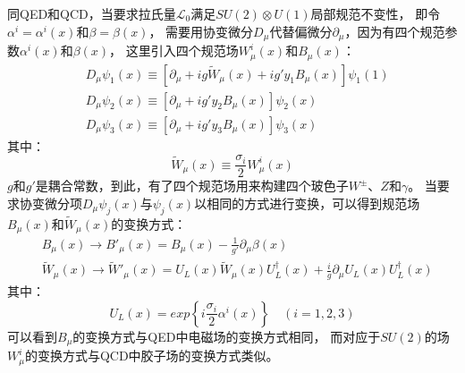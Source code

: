 同QED和QCD，当要求拉氏量$\mathcal{L}_0$满足$SU(2) \otimes U(1)$局部规范不变性，
即令$\alpha^i=\alpha^i(x)$和$\beta=\beta(x)$，
需要用协变微分$D_{\mu}$代替偏微分$\partial_{\mu}$，因为有四个规范参数$\alpha^i(x)$和$\beta(x)$，
这里引入四个规范场$W^i_{\mu}(x)$和$B_{\mu}(x)$：
\begin{equation} 
\label{eq:EW7}
 \begin{split}
  &D_{\mu}\psi_1(x) \equiv \left[ \partial_{\mu}+ig\widetilde{W}_{\mu}(x)+ig'y_1B_{\mu}(x) \right] \psi_1(1)
  \\
 & D_{\mu}\psi_2(x) \equiv \left[ \partial_{\mu}+ig'y_2B_{\mu}(x) \right] \psi_2(x)
  \\
 & D_{\mu}\psi_3(x) \equiv \left[ \partial_{\mu}+ig'y_3B_{\mu}(x) \right] \psi_3(x)
 \end{split}
\end{equation}
其中：
\begin{equation} 
\label{eq:EW8}
\widetilde{W}_{\mu}(x) \equiv \frac{\sigma_i}{2} W^i_{\mu}(x)
\end{equation}
$g$和$g'$是耦合常数，到此，有了四个规范场用来构建四个玻色子$W^{\pm}$、$Z$和$\gamma$。
当要求协变微分项$D_{\mu}\psi_j(x)$与$\psi_j(x)$以相同的方式进行变换，可以得到规范场$B_{\mu}(x)$和$\widetilde{W}_{\mu}(x)$的变换方式：
\begin{equation} 
\label{eq:EW9}
 \begin{split}
 & B_{\mu}(x) \rightarrow B'_{\mu}(x)=  B_{\mu}(x)-  \frac{1}{g'} \partial_{\mu}\beta(x)
  \\
 & \widetilde{W}_{\mu}(x) \rightarrow  \widetilde{W}'_{\mu}(x)=   U_L(x)\widetilde{W}_{\mu}(x) U^{\dagger}_L(x)+\frac{i}{g} \partial_{\mu}U_L(x) U^{\dagger}_L(x)
 \end{split}
\end{equation}
其中：
\begin{equation} 
\label{eq:EW18}
U_L(x)=exp\left\{ i\frac{\sigma_i}{2}\alpha^i(x) \right\} \quad (i=1,2,3)
\end{equation}
可以看到$B_{\mu}$的变换方式与QED中电磁场的变换方式相同，
而对应于$SU(2)$的场$W^i_{\mu}$的变换方式与QCD中胶子场的变换方式类似。

